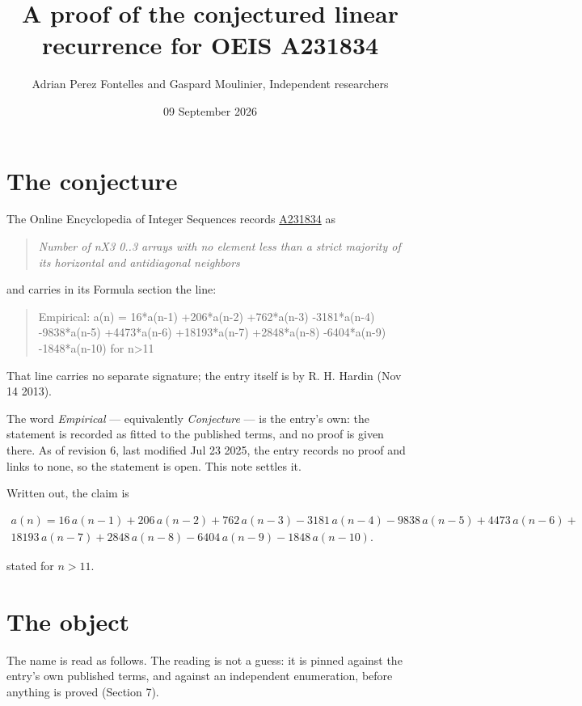 \documentclass[11pt]{article}
\title{A proof of the conjectured linear recurrence for OEIS A231834}
\author{Adrian Perez Fontelles and Gaspard Moulinier, Independent researchers}
\date{09 September 2026}
\theoremstyle{definition}
\begin{document}
\maketitle
\section{The conjecture}

The Online Encyclopedia of Integer Sequences records \href{https://oeis.org/A231834}{A231834} as

\begin{quote}\itshape Number of nX3 0..3 arrays with no element less than a strict majority of its horizontal and antidiagonal neighbors\end{quote}

and carries in its Formula section the line:

\begin{quote}\ttfamily Empirical: a(n) = 16*a(n-1) +206*a(n-2) +762*a(n-3) -3181*a(n-4) -9838*a(n-5) +4473*a(n-6) +18193*a(n-7) +2848*a(n-8) -6404*a(n-9) -1848*a(n-10) for n>11\end{quote}

That line carries no separate signature; the entry itself is by R. H. Hardin (Nov 14 2013).

The word {\itshape Empirical} --- equivalently {\itshape Conjecture} --- is the entry's own: the statement is recorded as fitted to the published terms, and no proof is given there. As of revision 6, last modified Jul 23 2025, the entry records no proof and links to none, so the statement is open. This note settles it.

Written out, the claim is

\begin{multline*} a(n) = 16\,a(n-1) + 206\,a(n-2) + 762\,a(n-3) - 3181\,a(n-4) - 9838\,a(n-5) + 4473\,a(n-6) + \\ 18193\,a(n-7) + 2848\,a(n-8) - 6404\,a(n-9) - 1848\,a(n-10). \end{multline*}

stated for $n > 11$.

\section{The object}

The name is read as follows. The reading is not a guess: it is pinned against the entry's own published terms, and against an independent enumeration, before anything is proved (Section 7).
\end{document}

